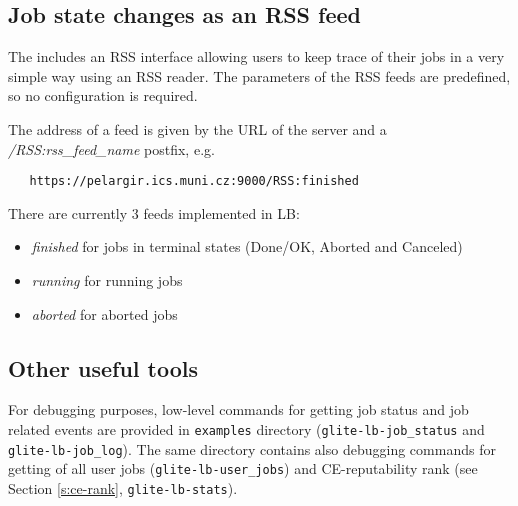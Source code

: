 \subsection{Job state changes as an RSS feed}
The \LB includes an RSS interface allowing users to keep trace of their jobs in a very simple way using an RSS reader. The parameters of the RSS feeds are predefined, so no configuration is required.

The address of a feed is given by the URL of the \LB server and a \textit{/RSS:rss\_feed\_name} postfix, e.g.
\begin{verbatim}
   https://pelargir.ics.muni.cz:9000/RSS:finished
\end{verbatim}  

There are currently 3 feeds implemented in LB:
\begin{itemize}
 \item \textit{finished} for jobs in terminal states (Done/OK, Aborted and Canceled)
 \item \textit{running} for running jobs
 \item \textit{aborted} for aborted jobs
\end{itemize}

\subsection{Other useful tools}

For debugging purposes, low-level commands for getting \LB job status and job related events are provided in 
\verb'examples' directory (\verb'glite-lb-job_status' and \verb'glite-lb-job_log'). The same directory
contains also debugging commands for getting of all user jobs (\verb'glite-lb-user_jobs') and
CE-reputability rank (see Section \ref{s:ce-rank}, \verb'glite-lb-stats').

